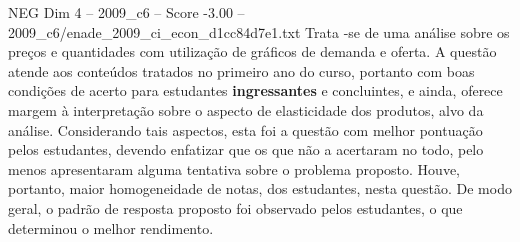 \begin{textsample}{NEG Dim 4 – 2009\_c6 – Score -3.00 – 2009\_c6/enade\_2009\_ci\_econ\_d1cc84d7e1.txt}
Trata -se de uma análise sobre os preços e quantidades com utilização de gráficos de demanda e oferta.
A questão atende aos conteúdos tratados no primeiro ano do curso, portanto com boas condições de acerto para estudantes \textbf{ingressantes} e concluintes, e ainda, oferece margem à interpretação sobre o aspecto de elasticidade dos produtos, alvo da análise.
Considerando tais aspectos, esta foi a questão com melhor pontuação pelos estudantes, devendo enfatizar que os que não a acertaram no todo, pelo menos apresentaram alguma tentativa sobre o problema proposto.
Houve, portanto, maior homogeneidade de notas, dos estudantes, nesta questão.
De modo geral, o padrão de resposta proposto foi observado pelos estudantes, o que determinou o melhor rendimento.

\end{textsample}
